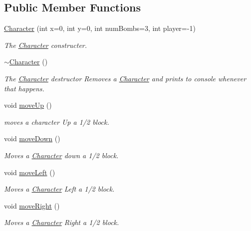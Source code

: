 \subsection*{Public Member Functions}
\begin{DoxyCompactItemize}
\item 
\hyperlink{class_character_ade1bb6dc548f73fb814702776457a1f3}{Character} (int x=0, int y=0, int num\-Bombs=3, int player=-\/1)
\begin{DoxyCompactList}\small\item\em The \hyperlink{class_character}{Character} constructer. \end{DoxyCompactList}\item 
\hyperlink{class_character_a9e9be564d05ded80962b2045aa70b3fc}{$\sim$\-Character} ()
\begin{DoxyCompactList}\small\item\em The \hyperlink{class_character}{Character} destructor Removes a \hyperlink{class_character}{Character} and prints to console whenever that happens. \end{DoxyCompactList}\item 
void \hyperlink{class_character_a5e63747ea61305391cd0ada0898e485c}{move\-Up} ()
\begin{DoxyCompactList}\small\item\em moves a character Up a 1/2 block. \end{DoxyCompactList}\item 
void \hyperlink{class_character_afa7763e81bca6a0b9b0c044f39c429f0}{move\-Down} ()
\begin{DoxyCompactList}\small\item\em Moves a \hyperlink{class_character}{Character} down a 1/2 block. \end{DoxyCompactList}\item 
void \hyperlink{class_character_a88dfc867ab226d3f115b891fc3b34d67}{move\-Left} ()
\begin{DoxyCompactList}\small\item\em Moves a \hyperlink{class_character}{Character} Left a 1/2 block. \end{DoxyCompactList}\item 
void \hyperlink{class_character_a0a8bf66e3d70c196a0fa8ce183f4aeb4}{move\-Right} ()
\begin{DoxyCompactList}\small\item\em Moves a \hyperlink{class_character}{Character} Right a 1/2 block. \end{DoxyCompactList}\item 

\end{DoxyCompactItemize}

